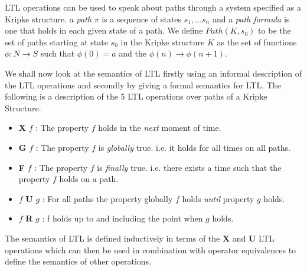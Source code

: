 LTL operations can be used to speak about paths through a system specified as a Kripke structure.
a \emph{path} $\pi$ is a sequence of states $s_1, \ldots s_n$ and a \emph{path formula} is one that holds in each given state of a path. We define $Path(K,s_0)$ to be the set of paths starting at state $s_0$ in the Kripke structure $K$ as the set of functions $\phi : N \to S$ such that $\phi(0) = a$ and the $\phi(n) \to \phi(n+1)$. 

We shall now look at the semantics of LTL firstly using an informal description of the LTL operations and secondly by giving a formal semantics for LTL. The following is a description of the 5 LTL operations over paths of a Kripke Structure.

\begin{itemize}
\item \textbf{X} $f$ : The property $f$ holds in the \emph{next} moment of time.
\item \textbf{G} $f$ : The property $f$ is \emph{globally} true. i.e. it holds for all times on all paths. 
\item \textbf{F} $f$ : The property $f$ is \emph{finally} true. i.e. there exists a time such that the property $f$ holds on a path.
\item $f$ \textbf{U} $g$ : For all paths the property globally $f$ holds \emph{until} property $g$ holds. 
\item $f$ \textbf{R} $g$ : f holds up to and including the point when $g$ holds.
\end{itemize}

The semantics of LTL is defined inductively in terms of the $\mathbf{X}$ and $\mathbf{U}$ LTL operations which can then be used in combination with operator equivalences to define the semantics of other operations.
 
